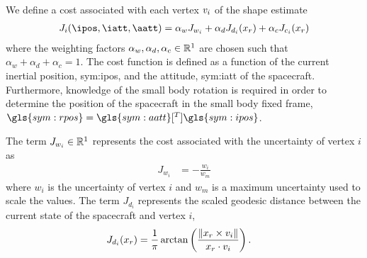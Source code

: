 \documentclass[letterpaper, paper,11pt]{AAS}		%
\begin{document}
We define a cost associated with each vertex \( v_i \) of the shape estimate
\begin{align}\label{eq:explore_cost}
    J_i (\ipos, \iatt, \aatt) = \alpha_w J_{w_i} + \alpha_d J_{d_i}(\rpos) + \alpha_c J_{c_i}(\rpos)
\end{align}
where the weighting factors \( \alpha_w, \alpha_d, \alpha_c \in \mathbb{R}^1 \) are chosen such that \( \alpha_w + \alpha_d + \alpha_c = 1 \).
The cost function is defined as a function of the current inertial position, \gls{sym:ipos}, and the attitude, \gls{sym:iatt} of the spacecraft.
Furthermore, knowledge of the small body rotation is required in order to determine the position of the spacecraft in the small body fixed frame, \( \gls{sym:rpos} = \gls{sym:aatt}[^T] \gls{sym:ipos}\).

The term \( J_{w_i} \in \mathbb{R}^1 \) represents the cost associated with the uncertainty of vertex \( i \) as
\begin{align}\label{eq:weight_cost}
    J_{w_i} &= - \frac{w_i}{w_m}
\end{align}
where \( w_i \) is the uncertainty of vertex \( i \) and \( w_m \) is a maximum uncertainty used to scale the values.
The term \( J_{d_i} \) represents the scaled geodesic distance between the current state of the spacecraft and vertex \( i \),
\begin{align}\label{eq:distance_cost}
    J_{d_i}(x_r) &= \frac{1}{\pi} \arctan \left(  \frac{\left\| x_r \times v_i \right\|}{x_r \cdot v_i} \right).
\end{align}
\end{document}
